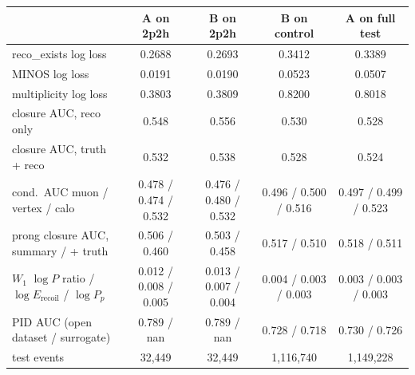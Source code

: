 \begin{tabular}{lcccc}
\toprule
 & A on 2p2h & B on 2p2h & B on control & A on full test \\
\midrule
reco\_exists log loss & 0.2688 & 0.2693 & 0.3412 & 0.3389 \\
MINOS log loss & 0.0191 & 0.0190 & 0.0523 & 0.0507 \\
multiplicity log loss & 0.3803 & 0.3809 & 0.8200 & 0.8018 \\
closure AUC, reco only & 0.548 & 0.556 & 0.530 & 0.528 \\
closure AUC, truth + reco & 0.532 & 0.538 & 0.528 & 0.524 \\
cond.\ AUC muon / vertex / calo & 0.478 / 0.474 / 0.532 & 0.476 / 0.480 / 0.532 & 0.496 / 0.500 / 0.516 & 0.497 / 0.499 / 0.523 \\
prong closure AUC, summary / + truth & 0.506 / 0.460 & 0.503 / 0.458 & 0.517 / 0.510 & 0.518 / 0.511 \\
$W_1$ $\log P$ ratio / $\log E_\mathrm{recoil}$ / $\log P_p$ & 0.012 / 0.008 / 0.005 & 0.013 / 0.007 / 0.004 & 0.004 / 0.003 / 0.003 & 0.003 / 0.003 / 0.003 \\
PID AUC (open dataset / surrogate) & 0.789 / nan & 0.789 / nan & 0.728 / 0.718 & 0.730 / 0.726 \\
test events & 32,449 & 32,449 & 1,116,740 & 1,149,228 \\
\bottomrule
\end{tabular}
